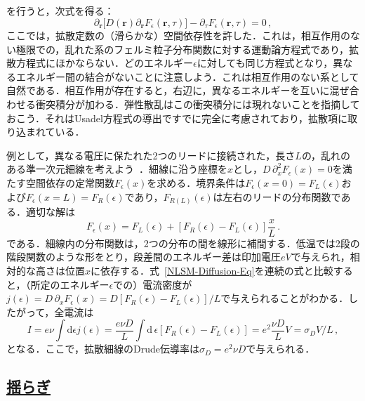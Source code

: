 \documentclass[a4paper,11pt]{ltjsarticle}
\newcommand{\subsectionlink}[1]{\subsection[#1]{\hyperlink{toc}{#1}}}
\def\d{\mathrm{d}}
\begin{document}
を行うと，次式を得る：
\begin{equation}\label{NLSM-Diffusion-Eq}
\partial_{\mathbf{r}}\big[D(\mathbf{r}) \partial_{\mathbf{r}} F_{\epsilon}(\mathbf{r},\tau)\big]-
\partial_{\tau}F_{\epsilon}(\mathbf{r},\tau)=0\,,
\end{equation}
ここでは，拡散定数の（滑らかな）空間依存性を許した．これは，相互作用のない極限での，乱れた系のフェルミ粒子分布関数に対する運動論方程式であり，拡散方程式にほかならない．どのエネルギー$\epsilon$に対しても同じ方程式となり，異なるエネルギー間の結合がないことに注意しよう．これは相互作用のない系として自然である．相互作用が存在すると，右辺に，異なるエネルギーを互いに混ぜ合わせる衝突積分が加わる．弾性散乱はこの衝突積分には現れないことを指摘しておこう．それはUsadel方程式の導出ですでに完全に考慮されており，拡散項に取り込まれている．



例として，異なる電圧に保たれた2つのリードに接続された，長さ$L$の，乱れのある準一次元細線を考えよう~\cite{Pierre}．細線に沿う座標を$x$とし，$D\,\partial^{2}_{x}F_{\epsilon}(x)=0$を満たす空間依存の定常関数$F_{\epsilon}(x)$を求める．境界条件は$F_{\epsilon}(x=0)=F_{L}(\epsilon)$および$F_{\epsilon}(x=L)=F_{R}(\epsilon)$であり，$F_{R(L)}(\epsilon)$は左右のリードの分布関数である．適切な解は
\begin{equation}
F_{\epsilon}(x)=F_{L}(\epsilon)+[F_{R}(\epsilon)-F_{L}(\epsilon)]\frac{x}{L}\,.
\end{equation}
である．細線内の分布関数は，2つの分布の間を線形に補間する．低温では2段の階段関数のような形をとり，段差間のエネルギー差は印加電圧$eV$で与えられ，相対的な高さは位置$x$に依存する．式~\eqref{NLSM-Diffusion-Eq}を連続の式と比較すると，（所定のエネルギー$\epsilon$での）電流密度が$j(\epsilon)=D\,\partial_{x}
F_{\epsilon}(x)=D[F_{R}(\epsilon)-F_{L}(\epsilon)]/L$で与えられることがわかる．したがって，全電流は
$$I=e\nu\int\d\epsilon
j(\epsilon)=\frac{e\nu
D}{L}\int\d\,\epsilon[F_{R}(\epsilon)-F_{L}(\epsilon)]=e^{2}\frac{\nu
D}{L}V=\sigma_D V/L\,,$$
となる．ここで，拡散細線のDrude伝導率は$\sigma_{D}=e^{2}\nu D$で与えられる．



\subsectionlink{揺らぎ}\label{sec_NLSM-5}
\end{document}
